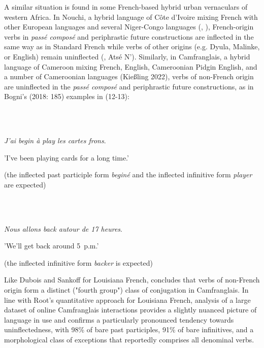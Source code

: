 \documentclass[output=paper]{langscibook}
\begin{document}
A similar situation is found in some French-based hybrid urban vernaculars of western Africa. In Nouchi, a hybrid language of Côte d'Ivoire mixing French with other European languages and several Niger-Congo languages (\citealt{Sande2015}, \citealt{Boutin2021}), French-origin verbs in \textit{passé composé} and periphrastic future constructions are inflected in the same way as in Standard French while verbs of other origins (e.g. Dyula, Malinke, or English) remain uninflected (\citealt{Ahua2008}, Atsé N'\citealt{Cho2014}). Similarly, in Camfranglais, a hybrid language of Cameroon mixing French, English, Cameroonian Pidgin English, and a number of Cameroonian languages (Kießling 2022), verbs of non-French origin are uninflected in the \textit{passé composé} and periphrastic future constructions, as in Bogni's (2018: 185) examples in (12-13):

\ea%
    \label{ex:key:12}
    \gll \\
         \\
    \glt
    \z %

          \textit{J'ai begin à play les cartes frons}.

  {}'I've been playing cards for a long time.'

  (the inflected past participle form \textit{beginé} and the inflected   infinitive form \textit{player} are expected)

\ea%
    \label{ex:key:13}
    \gll \\
         \\
    \glt
    \z %

          \textit{Nous allons back autour de 17 heures}. 

  {}'We'll get back around 5~p.m.'

  (the inflected infinitive form \textit{backer} is expected)

Like Dubois and Sankoff for Louisiana French, \citet{Bogni2018} concludes that verbs of non-French origin form a distinct ("fourth group") class of conjugation in Camfranglais. In line with Root's quantitative approach for Louisiana French,  analysis of a large dataset of online Camfranglais interactions provides a slightly nuanced picture of language in use and confirms a particularly pronounced tendency towards uninflectedness, with 98\% of bare past participles, 91\% of bare infinitives, and a morphological class of exceptions that reportedly comprises all denominal verbs.
\end{document}
